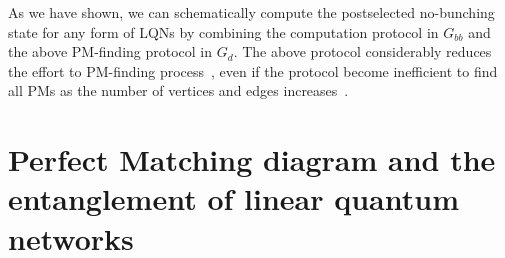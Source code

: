 \documentclass[a4paper,twocolumn,8pt,accepted=2021-12-15]{quantumarticle}
\newcommand{\nn}{\nonumber}
\def\P{\Psi}
\def\>{\rangle}
\begin{document}
	
	As we have shown, we can schematically compute the postselected no-bunching state for any form of LQNs by combining the computation protocol in $G_{bb}$ and the above PM-finding protocol in $G_d$. 
	The above protocol considerably reduces the effort to PM-finding process~\cite{fukuda1994finding, uno1997algorithms,uno2001fast}, even if the protocol become inefficient to find all PMs as the number of vertices and edges increases~\cite{ausiello2012complexity}.
	
	\section{Perfect Matching diagram and the entanglement of linear quantum networks}\label{PM diagram}
	
\end{document}
